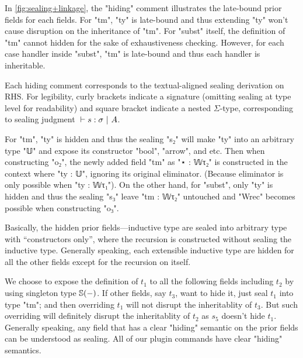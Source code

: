 In \cref{fig:sealing+linkage}, the "hiding" comment illustrates the late-bound prior fields for each fields.   For "tm", "ty" is late-bound and thus extending "ty" won't cause disruption on the inheritance of "tm". For "subst" itself, the definition of "tm"  cannot hidden for the sake of exhaustiveness checking. However, for each case handler inside "subst", "tm" is late-bound and thus each handler is inheritable. 

Each hiding comment corresponds to the textual-aligned sealing derivation on RHS. For legibility, curly brackets indicate a signature (omitting sealing at type level for readability) and square bracket indicate a nested $\Sigma$-type, corresponding to sealing judgment $ {} \vdash {s} : {\sigma} \ |\ {A} $.

For "tm", "ty" is hidden and thus the sealing "s₂" will make "ty" into an arbitrary type "𝕌" and expose its constructor "bool", "arrow", and etc. Then when constructing "o₂", the newly added field "tm" as "⋆ : 𝕎τ₂" is constructed in the context where "ty : 𝕌", ignoring its original eliminator. (Because eliminator is only possible when "ty : 𝕎τ₁"). On the other hand, for "subst", only "ty" is hidden and thus the sealing "s₃" leave "tm : 𝕎τ₂" untouched and "Wrec" becomes possible when constructing "o₃".

Basically, the hidden prior fields---inductive type are sealed into arbitrary type with ``constructors only'', where the recursion is constructed without sealing the inductive type.  Generally speaking, each extensible inductive type are hidden for all the other fields except for the recursion on itself. 

We choose to expose the definition of $t_1$ to all the following fields including $t_2$ by using singleton type $\mathbb{S}({-})$. If other fields, say $t_3$, want to hide it, just seal $t_1$ into type "tm"; and then overriding $t_1$ will not disrupt the inheritablity of $t_3$. But such overriding will definitely disrupt the inheritablity of $t_2$ as $s_5$ doesn't hide $t_1$. Generally speaking, any field that has a clear "hiding" semantic on the prior fields can be understood as sealing. All of our plugin commands have clear "hiding" semantics.



